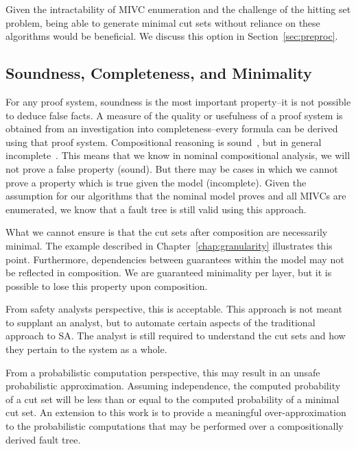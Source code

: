 Given the intractability of MIVC enumeration and the challenge of the hitting set problem, being able to generate minimal cut sets without reliance on these algorithms would be beneficial. We discuss this option in Section~\ref{sec:preproc}.

\subsection{Soundness, Completeness, and Minimality}
For any proof system, soundness is the most important property--it is not possible to deduce false facts. A measure of the quality or usefulness of a proof system is obtained from an investigation into completeness--every formula can be derived using that proof system. Compositional reasoning is sound~\cite{CompTechReport}, but in general incomplete~\cite{namjoshi2010completeness}. This means that we know in nominal compositional analysis, we will not prove a false property (sound). But there may be cases in which we cannot prove a property which is true given the model (incomplete). Given the assumption for our algorithms that the nominal model proves and all MIVCs are enumerated, we know that a fault tree is still valid using this approach. 

What we cannot ensure is that the cut sets after composition are necessarily minimal. The example described in Chapter~\ref{chap:granularity} illustrates this point. Furthermore, dependencies between guarantees within the model may not be reflected in composition. We are guaranteed minimality per layer, but it is possible to lose this property upon composition. 

From safety analysts perspective, this is acceptable. This approach is not meant to supplant an analyst, but to automate certain aspects of the traditional approach to SA. The analyst is still required to understand the cut sets and how they pertain to the system as a whole. 

From a probabilistic computation perspective, this may result in an unsafe probabilistic approximation. Assuming independence, the computed probability of a cut set will be less than or equal to the computed probability of a minimal cut set. An extension to this work is to provide a meaningful over-approximation to the probabilistic computations that may be performed over a compositionally derived fault tree. 










